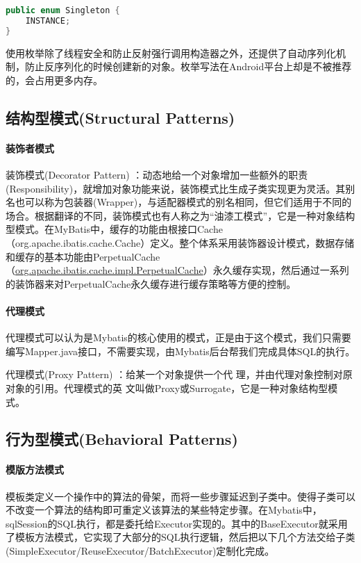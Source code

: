 \documentclass[../../../interview-questions.tex]{subfiles}
\begin{document}
\begin{lstlisting}[language=Java]
public enum Singleton {
    INSTANCE;
}
\end{lstlisting}

使用枚举除了线程安全和防止反射强行调用构造器之外，还提供了自动序列化机制，防止反序列化的时候创建新的对象。枚举写法在Android平台上却是不被推荐的，会占用更多内存。


\subsection{结构型模式(Structural Patterns)}

\paragraph{装饰者模式}

装饰模式(Decorator Pattern) ：动态地给一个对象增加一些额外的职责(Responsibility)，就增加对象功能来说，装饰模式比生成子类实现更为灵活。其别名也可以称为包装器(Wrapper)，与适配器模式的别名相同，但它们适用于不同的场合。根据翻译的不同，装饰模式也有人称之为“油漆工模式”，它是一种对象结构型模式。在MyBatis中，缓存的功能由根接口Cache（org.apache.ibatis.cache.Cache）定义。整个体系采用装饰器设计模式，数据存储和缓存的基本功能由PerpetualCache（\url{org.apache.ibatis.cache.impl.PerpetualCache}）永久缓存实现，然后通过一系列的装饰器来对PerpetualCache永久缓存进行缓存策略等方便的控制。

\paragraph{代理模式}

代理模式可以认为是Mybatis的核心使用的模式，正是由于这个模式，我们只需要编写Mapper.java接口，不需要实现，由Mybatis后台帮我们完成具体SQL的执行。

代理模式(Proxy Pattern) ：给某一个对象提供一个代 理，并由代理对象控制对原对象的引用。代理模式的英 文叫做Proxy或Surrogate，它是一种对象结构型模式。

\subsection{行为型模式(Behavioral Patterns)}

\paragraph{模版方法模式}

模板类定义一个操作中的算法的骨架，而将一些步骤延迟到子类中。使得子类可以不改变一个算法的结构即可重定义该算法的某些特定步骤。在Mybatis中，sqlSession的SQL执行，都是委托给Executor实现的。其中的BaseExecutor就采用了模板方法模式，它实现了大部分的SQL执行逻辑，然后把以下几个方法交给子类(SimpleExecutor/ReuseExecutor/BatchExecutor)定制化完成。
\end{document}
